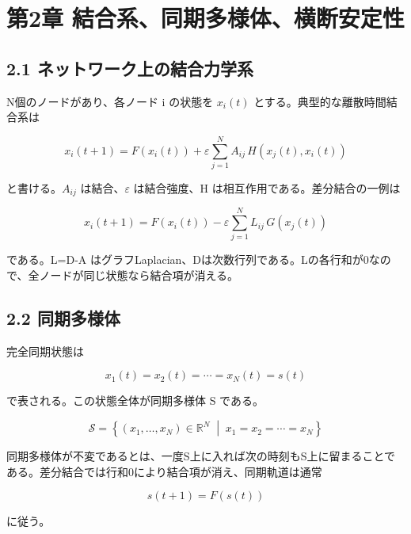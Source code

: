 \documentclass[11pt,a4paper]{ltjsarticle}
\begin{document}
\goodbreak

\section*{\textcolor{researchink}{第2章 結合系、同期多様体、横断安定性}}


\subsection*{\textcolor{researchblue}{2.1 ネットワーク上の結合力学系}}

N個のノードがあり、各ノード i の状態を \(x_i(t)\) とする。典型的な離散時間結合系は\par

\[
x_i(t+1)=F\!\left(x_i(t)\right)+\varepsilon\sum_{j=1}^{N}A_{ij}\,H\!\left(x_j(t),x_i(t)\right)
\]

と書ける。\(A_{ij}\) は結合、\(\varepsilon\) は結合強度、H は相互作用である。差分結合の一例は\par

\[
x_i(t+1)=F\!\left(x_i(t)\right)-\varepsilon\sum_{j=1}^{N}L_{ij}\,G\!\left(x_j(t)\right)
\]

である。L=D-A はグラフLaplacian、Dは次数行列である。Lの各行和が0なので、全ノードが同じ状態なら結合項が消える。\par

\subsection*{\textcolor{researchblue}{2.2 同期多様体}}

完全同期状態は\par

\[
x_1(t)=x_2(t)=\cdots=x_N(t)=s(t)
\]

で表される。この状態全体が同期多様体 S である。\par

\[
\mathcal{S}=\left\{(x_1,\ldots,x_N)\in\mathbb{R}^{N}\;\middle|\;x_1=x_2=\cdots=x_N\right\}
\]

同期多様体が不変であるとは、一度S上に入れば次の時刻もS上に留まることである。差分結合では行和0により結合項が消え、同期軌道は通常\par

\[
s(t+1)=F\!\left(s(t)\right)
\]

に従う。\par
\end{document}
